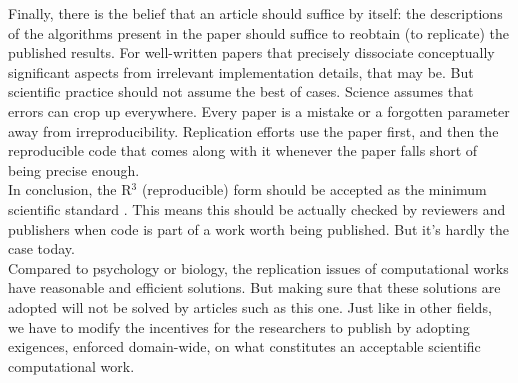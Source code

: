 \documentclass[a4paper,11pt]{article}
\begin{document}
Finally, there is the belief that an article should suffice by itself: the descriptions of the algorithms present in the paper should suffice to reobtain (to replicate) the published results. For well-written papers that precisely dissociate conceptually significant aspects from irrelevant implementation details, that may be. But scientific practice should not assume the best of cases. Science assumes that errors can crop up everywhere. Every paper is a mistake or a forgotten parameter away from irreproducibility. Replication efforts use the paper first, and then the reproducible code that comes along with it whenever the paper falls short of being precise enough.\\

In conclusion, the R$^3$ (reproducible) form should be accepted as the minimum
scientific standard \citep{Wilson:2017}. This means this should be actually
checked by reviewers and publishers when code is part of a work worth being
published. But it's hardly the case today.\\


Compared to psychology or biology, the replication issues of computational works have reasonable and efficient solutions. But making sure that these solutions are adopted will not be solved by articles such as this one. Just like in other fields, we have to modify the incentives for the researchers to publish by adopting exigences, enforced domain-wide, on what constitutes an acceptable scientific computational work.


\renewcommand*{\bibfont}{\small}
\printbibliography[title=References]


\end{document}
